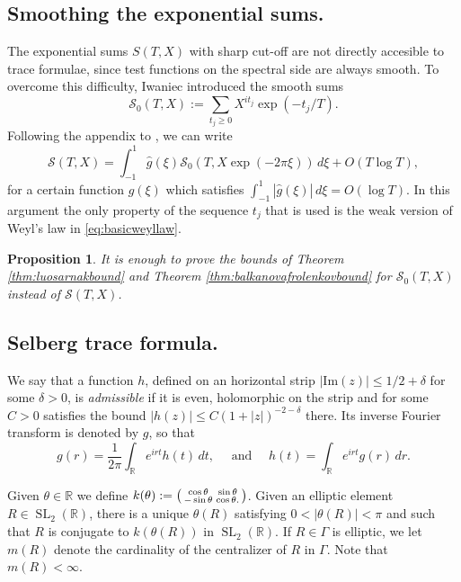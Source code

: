 \documentclass{article}
\newtheorem{prop}[thm]{Proposition}
\theoremstyle{named}
\renewcommand{\S}{\mathcal{S}}
\newcommand{\R}{\mathbb{R}}
\DeclareMathOperator{\SL}{SL}
\begin{document}
\subsection{Smoothing the exponential sums.}\label{subsec:smoothingtheexponentialsum}
The exponential sums $S(T, X)$ with sharp cut-off are not directly accesible to trace formulae, since test functions on the spectral side are always smooth. To overcome this difficulty, Iwaniec introduced the smooth sums
\begin{equation}\label{eq:smoothversionofS}
    \S_0(T, X) := \sum_{t_j \geq 0} X^{it_j}\exp(-t_j/T). 
\end{equation}
Following the appendix to \cite{luosarnak}, we can write
\begin{equation*}
    \S(T, X) = \int_{-1}^1 \widehat{g}(\xi) \S_0(T, X\exp(-2\pi \xi)) \, d\xi + O(T \log T),
\end{equation*}
for a certain function $\widehat{g}(\xi)$ which satisfies $\int_{-1}^1 |\widehat{g}(\xi)| \, d\xi = O(\log T)$. In this argument the only property of the sequence $t_j$ that is used is the weak version of Weyl's law in \eqref{eq:basicweyllaw}. 

\begin{prop}\label{prop:conclusionsmoothingsum}
It is enough to prove the bounds of Theorem \ref{thm:luosarnakbound} and Theorem \ref{thm:balkanovafrolenkovbound} for $\S_0(T, X)$ instead of $\S(T, X)$. 
\end{prop}

\subsection{Selberg trace formula.}\label{subsec:selbergtraceformula}
We say that a function $h$, defined on an horizontal strip $|\text{Im}(z)|\leq 1/2 +\delta$ for some $\delta > 0$, is \emph{admissible} if it is even, holomorphic on the strip and for some $C > 0$ satisfies the bound $|h(z)| \leq C(1 + |z|)^{-2 - \delta}$ there.
Its inverse Fourier transform is denoted by $g$, so that 
\begin{equation}\label{eq:pairtestfunctionselbergtraceformula}
    g(r) = \frac{1}{2\pi}\int_\R e^{irt}h(t) \, dt, \quad \text{ and } \quad h(t) = \int_\R e^{irt} g(r) \, dr.
\end{equation}

Given $\theta \in \R$ we define $k(\theta) := \begin{psmallmatrix}
    \cos \theta & \sin \theta\\
    -\sin \theta & \cos \theta.
    \end{psmallmatrix}$. 
Given an elliptic element $R \in \SL_2(\R)$, there is a unique $\theta(R)$ satisfying $0 < |\theta(R)| < \pi$ and such that $R$ is conjugate to $k(\theta(R))$ in $\SL_2(\R)$. If $R \in \Gamma$ is elliptic, we let $m(R)$ denote the cardinality of the centralizer of $R$ in $\Gamma$. Note that $m(R) < \infty$. 
\end{document}
